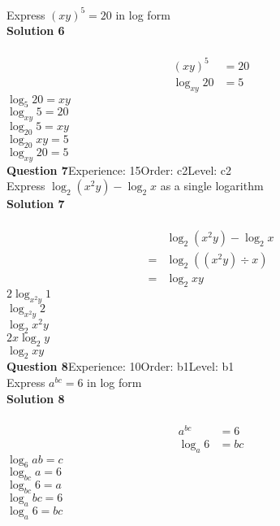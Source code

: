 \documentclass{article}
\begin{document}
Express $(xy)^5=20$ in log form\\[4pt]
\noindent\textbf{Solution 6}\\[2pt]
\\[-10pt]\begin{align*}
(xy)^5&=20\\[2pt]
\log_{xy}20&=5
\end{align*}
$\log_{5}20=xy$\\
$\log_{xy}5=20$\\
$\log_{20}5=xy$\\
$\log_{20}xy=5$\\
$\log_{xy}20=5$\\
\noindent\textbf{Question 7}\hspace{20pt}Experience: 15\hspace{20pt}Order: c2\hspace{20pt}Level: c2\\[2pt]
Express $\log_{2}(x^2y)-\log_{2}x$ as a single logarithm\\[4pt]
\noindent\textbf{Solution 7}\\[2pt]
\\[-10pt]\begin{align*}
&\log_{2}(x^2y)-\log_{2}x\\[2pt]
=&\log_{2}((x^2y) \div x)\\[2pt]
=&\log_{2}xy
\end{align*}
$2\log_{x^2y}1$\\
$\log_{x^2y}2$\\
$\log_{2}x^2y$\\
$2x\log_{2}y$\\
$\log_{2}xy$\\
\noindent\textbf{Question 8}\hspace{20pt}Experience: 10\hspace{20pt}Order: b1\hspace{20pt}Level: b1\\[2pt]
Express $a^{bc}=6$ in log form\\[4pt]
\noindent\textbf{Solution 8}\\[2pt]
\\[-10pt]\begin{align*}
a^{bc}&=6\\[2pt]
\log_{a}6&=bc
\end{align*}
$\log_{6}ab=c$\\
$\log_{bc}a=6$\\
$\log_{bc}6=a$\\
$\log_{a}bc=6$\\
$\log_{a}6=bc$\\
\end{document}
